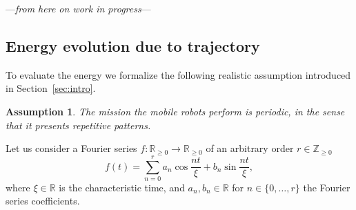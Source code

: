 \documentclass[letterpaper,10pt,conference]{ieeeconf}
\newtheorem{assm}[thm]{Assumption}
\begin{document}
\begin{center}\vspace{.2cm}---\emph{from here on work in progress}---\vspace{.6cm}\end{center}

\subsection{Energy evolution due to trajectory}
\label{sec:energy-model}

To evaluate the energy we formalize the following realistic assumption introduced in Section~\ref{sec:intro}.
\begin{assm}\label{assm:periodic}
The mission the mobile robots perform is periodic, in the sense that it presents repetitive patterns.
\end{assm}

Let us consider a Fourier series $f:\mathbb{R}_{\geq 0}\rightarrow\mathbb{R}_{\geq 0}$ of an arbitrary order $r\in\mathbb{Z}_{\geq 0}$
\begin{equation}\label{eq:fourier}
  f(t)=\sum_{n=0}^{r}{a_n\cos{\frac{nt}{\xi}}+b_n\sin{\frac{nt}{\xi}}},
\end{equation}
where $\xi\in\mathbb{R}$ is the characteristic time, and $a_n, b_n\in\mathbb{R}$ for $n\in\{0,\dotsc,r\}$ the Fourier series coefficients.
\end{document}
